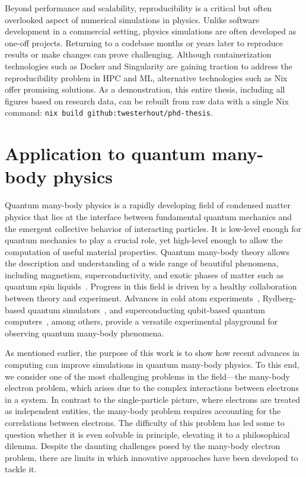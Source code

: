 Beyond performance and scalability, reproducibility is a critical but often overlooked aspect of numerical simulations in physics. Unlike software development in a commercial setting, physics simulations are often developed as one-off projects. Returning to a codebase months or years later to reproduce results or make changes can prove challenging. Although containerization technologies such as Docker and Singularity are gaining traction to address the reproducibility problem in HPC and ML, alternative technologies such as Nix~ offer promising solutions. As a demonstration, this entire thesis, including all figures based on research data, can be rebuilt from raw data with a single Nix command: \texttt{nix build github:twesterhout/phd-thesis}.

\section{Application to quantum many-body physics}

Quantum many-body physics is a rapidly developing field of condensed matter physics that lies at the interface between fundamental quantum mechanics and the emergent collective behavior of interacting particles. It is low-level enough for quantum mechanics to play a crucial role, yet high-level enough to allow the computation of useful material properties. Quantum many-body theory allows the description and understanding of a wide range of beautiful phenomena, including magnetism, superconductivity, and exotic phases of matter such as quantum spin liquids~\cite{Zhou_2017_Quantum_spin_li}. Progress in this field is driven by a healthy collaboration between theory and experiment. Advances in cold atom experiments~\cite{Gross_2017_Quantum_simulat}, Rydberg-based quantum simulators~\cite{Browae_2020_Many_body_physi}, and superconducting qubit-based quantum computers~\cite{Anders_2025_Thermalization}, among others, provide a versatile experimental playground for observing quantum many-body phenomena.

As mentioned earlier, the purpose of this work is to show how recent advances in computing can improve simulations in quantum many-body physics. To this end, we consider one of the most challenging problems in the field---the many-body electron problem, which arises due to the complex interactions between electrons in a system. In contrast to the single-particle picture, where electrons are treated as independent entities, the many-body problem requires accounting for the correlations between electrons. The difficulty of this problem has led some to question whether it is even solvable in principle, elevating it to a philosophical dilemma. Despite the daunting challenges posed by the many-body electron problem, there are limits in which innovative approaches have been developed to tackle it.

